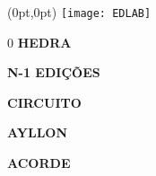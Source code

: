 \begin{textblock*}{5.625in}(0pt,0pt)%
\vspace*{-3cm}
\hspace*{-2.1cm}\texttt{[image: EDLAB]}
\end{textblock*}
\pagebreak

\pagestyle{indice}
{}

\vspace{1.2cm}

{\LARGE
\hspace*{6.8cm}0\pageref{hedra} \textbf{HEDRA}

\hspace*{6.8cm}\pageref{n-1} \textbf{N-1 EDIÇÕES}

\hspace*{6.8cm}\pageref{circuito} \textbf{CIRCUITO}

\hspace*{6.8cm}\pageref{ayllon} \textbf{AYLLON}

\hspace*{6.8cm}\pageref{acorde} \textbf{ACORDE}


}

\hspace*{-7cm}\hrulefill\hspace*{-7cm}

\vspace{1cm}

